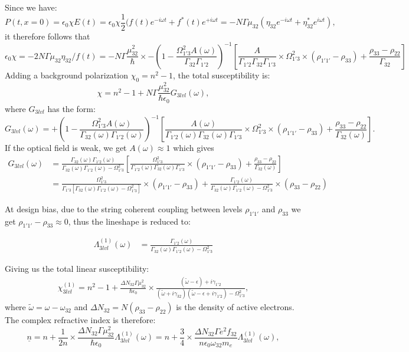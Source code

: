 \documentclass[10pt,letterpaper]{article}
\def\uline{\underline}
\begin{document}
	Since we have:
	$$
	P(t,x=0) = \epsilon_0\chi E(t) = \epsilon_0 \chi \frac{1}{2} ( f(t)e^{-i\omega t} +f^*(t)e^{+i\omega t}= -N\Gamma\mu_{32}(\eta_{32}e^{-i\omega t}+\eta_{32}^*e^{i\omega t}),
	$$
	it therefore follows that 
	$$
	\epsilon_0 \chi = -2N\Gamma\mu_{32}\eta_{32}/f(t) = -N\Gamma\frac{\mu_{32}^2}{\hbar}\times -(1-\frac{\Omega_{1'3}^2  A(\omega)}{\Gamma_{32}\Gamma_{1'2}})^{-1} \left [ \frac{A}{\Gamma_{1'2}\Gamma_{32}\Gamma_{1'3}}\times \Omega_{1'3}^2\times(\rho_{1'1'}-\rho_{33}) +\frac{\rho_{33}-\rho_{22}}{\Gamma_{32}} \right]
	$$
	Adding a background polarization $\chi_0 = n^2-1$, the total susceptibility is:
	$$
	\chi = n^2-1+N\Gamma\frac{\mu_{32}^2}{\hbar\epsilon_0}G_{3lvl}(\omega),
	$$
	where $G_{3lvl}$ has the form:
	$$
	G_{3lvl}(\omega) =+
	(1-\frac{\Omega_{1'3}^2  A(\omega)}{\Gamma_{32}(\omega)\Gamma_{1'2}(\omega)})^{-1} \left [ \frac{A(\omega)}{\Gamma_{1'2}(\omega)\Gamma_{32}(\omega)\Gamma_{1'3}}\times \Omega_{1'3}^2\times(\rho_{1'1'}-\rho_{33}) +\frac{\rho_{33}-\rho_{22}}{\Gamma_{32}(\omega)} \right].
	$$
	If the optical field is weak, we get $A(\omega) \approx 1$ which gives 
	\begin{align}
	G_{3lvl}(\omega)&= 
	\frac{\Gamma_{32}(\omega)\Gamma_{1'2}(\omega) }{\Gamma_{32}(\omega)\Gamma_{1'2}(\omega)-\Omega_{1'3}^2} \left [ \frac{\Omega_{1'3}^2}{\Gamma_{1'2}(\omega)\Gamma_{32}(\omega)\Gamma_{1'3}}\times(\rho_{1'1'}-\rho_{33}) +\frac{\rho_{33}-\rho_{22}}{\Gamma_{32}(\omega)} \right] \\
	&=  \frac{\Omega_{1'3}^2}{\Gamma_{1'3}\left[\Gamma_{32}(\omega)\Gamma_{1'2}(\omega)-\Omega_{1'3}^2\right]}\times(\rho_{1'1'}-\rho_{33}) +\frac{\Gamma_{1'2}(\omega)}{\Gamma_{32}(\omega)\Gamma_{1'2}(\omega)-\Omega_{1'3}^2}\times(\rho_{33}-\rho_{22}) 
	\end{align}
	
	At design bias, due to the string coherent coupling between levels $\rho_{1'1'}$ and $\rho_{33}$ we get $\rho_{1'1'} - \rho_{33}\approx {0}$, thus the lineshape is reduced to:
	
	\begin{align}
	\Lambda_{3lvl}^{(1)}(\omega) &= 
	\frac{\Gamma_{1'2}(\omega)}{\Gamma_{32}(\omega)\Gamma_{1'2}(\omega)-\Omega_{1'3}^2} 
	\end{align}
	
	Giving us the total linear susceptibility:
	\begin{align}
	\chi_{3lvl}^{(1)} = n^2-1+\frac{\Delta N_{32}\Gamma\mu_{32}^2}{\hbar\epsilon_0}\times\frac{(\tilde{\omega}-\epsilon)+i\gamma_{1'2}}{(\tilde{\omega}+i\gamma_{32})(\tilde{\omega}-\epsilon+i\gamma_{1'2})-\Omega_{1'3}^2}, 
	\end{align}
	where $\tilde{\omega} = \omega - \omega_{32}$ and $\Delta N_{32} = N(\rho_{33}-\rho_{22})$ is the density of active electrons.  The complex refractive index is therefore:
	$$
	\uline{n} = n+\frac{1}{2n}\times \frac{\Delta N_{32}\Gamma \mu_{32}^2}{\hbar \epsilon_0} \Lambda_{3lvl}^{(1)}({\omega}) = n+\frac{3}{4}\times \frac{\Delta N_{32}\Gamma e^2f_{32}}{n\epsilon_0\omega_{32}m_e} \Lambda_{3lvl}^{(1)}({\omega}),
	$$ 
	
\end{document}
